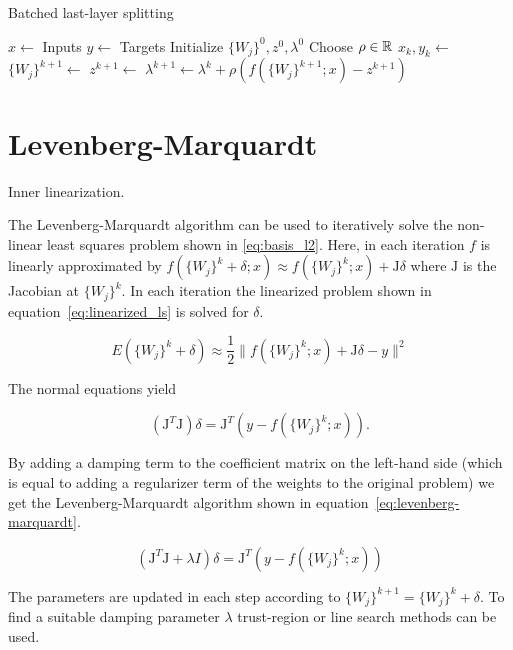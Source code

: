\documentclass[english,11pt,a4paper]{article}
\begin{document}
\begin{algorithm}
	\caption{Batched last-layer splitting}
	\label{alg:sb}
	\begin{algorithmic}[1]
		\State $x \gets$ Inputs
		\State $y \gets$ Targets
		\State Initialize $\{W_j\}^0, z^0, \lambda^0$
		\State Choose $\rho \in \mathbb{R}$
			\State $x_k, y_k \gets$ 
			\State $\{W_j\}^{k+1} \gets$ 
			\State $z^{k+1} \gets$ 
			\State $\lambda^{k+1} \gets \lambda^k + \rho (f(\{W_j\}^{k+1};x)-z^{k+1})$
		\EndFor
	\end{algorithmic}
\end{algorithm}

\section{Levenberg-Marquardt}

Inner linearization.

The Levenberg-Marquardt algorithm can be used to iteratively solve the non-linear least squares problem shown in \ref{eq:basis_l2}. Here, in each iteration $f$ is linearly approximated by $f(\{W_j\}^k+\delta;x) \approx f(\{W_j\}^k;x) + \mathrm{J}\delta$ where $\mathrm{J}$ is the Jacobian at $\{W_j\}^k$. In each iteration the linearized problem shown in equation~\ref{eq:linearized_ls} is solved for $\delta$.

\begin{equation}
	E(\{W_j\}^k+\delta) \approx \frac{1}{2} \|f(\{W_j\}^k;x) + \mathrm{J}\delta - y\|^2
	\label{eq:linearized_ls}
\end{equation}

The normal equations yield

\begin{equation}
	(\mathrm{J}^T \mathrm{J}) \delta = \mathrm{J}^T(y - f(\{W_j\}^k;x)).
\end{equation}

By adding a damping term to the coefficient matrix on the left-hand side (which is equal to adding a regularizer term of the weights to the original problem) we get the Levenberg-Marquardt algorithm shown in equation~\ref{eq:levenberg-marquardt}.

\begin{equation}
	(\mathrm{J}^T \mathrm{J} + \lambda I) \delta = \mathrm{J}^T(y - f(\{W_j\}^k;x))
	\label{eq:levenberg-marquardt}
\end{equation}

The parameters are updated in each step according to $\{W_j\}^{k+1} = \{W_j\}^k + \delta$. To find a suitable damping parameter $\lambda$ trust-region or line search methods can be used.
\end{document}
